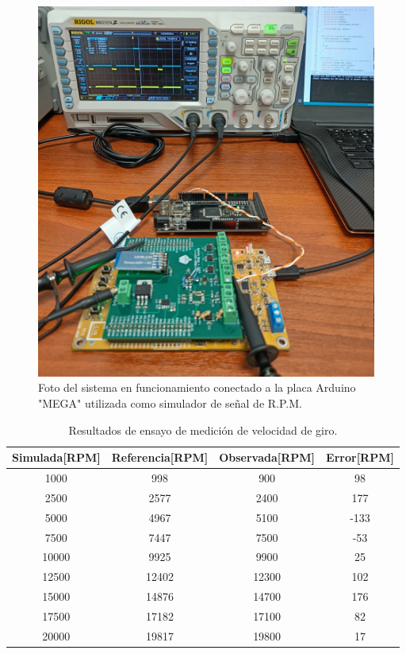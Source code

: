 \begin{figure}[htpb]
\centering
\includegraphics[width=.8\textwidth]{./Figures/foto-rpm.jpg}
\caption{Foto del sistema en funcionamiento conectado a la placa Arduino "MEGA"  utilizada como simulador de señal de R.P.M.}
\label{fig:foto-rpm}
\end{figure}

\begin{table}[htpb]
	\centering
	\caption{Resultados de ensayo de medición de velocidad de giro.}
	\centering
	\begin{tabular}{c c c c}    
		\toprule
		\textbf{Simulada[RPM]} &  \textbf{Referencia[RPM]}   & \textbf{Observada[RPM]} & \textbf{Error[RPM]}\\
		\midrule
		1000	&	998 &	900 & 98\\
		2500	&	2577 & 2400 & 177\\
		5000	&	4967 & 5100 & -133 \\
		7500	&	7447 & 7500 & -53\\
		10000	&	9925 & 9900 & 25\\
		12500	&	12402 & 12300 & 102\\
		15000	&	14876 & 14700 & 176\\
		17500	&	17182 & 17100 & 82\\
		20000	&	19817 & 19800 & 17\\		
		\bottomrule
	\end{tabular}
	\label{tab:ensayo-rpm}
\end{table}

